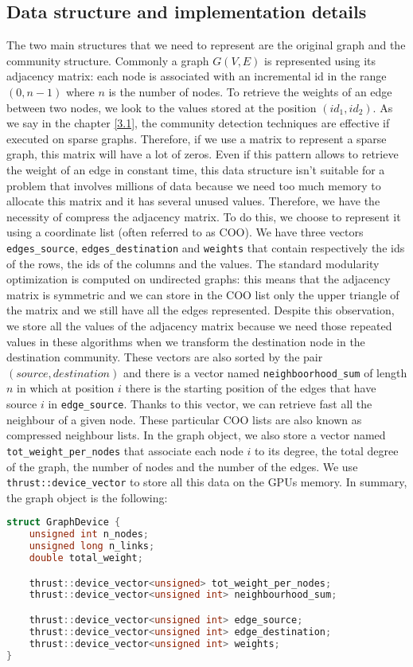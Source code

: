 \subsection{Data structure and implementation details}
The two main structures that we need to represent are the original graph and the community structure. Commonly a graph $G(V, E)$ is represented using its adjacency matrix: each node is associated with an incremental id in the range $(0, n-1)$ where $n$ is the number of nodes. To retrieve the weights of an edge between two nodes, we look to the values stored at the position $(id_1, id_2)$. As we say in the chapter \ref{3.1}, the community detection techniques are effective if executed on sparse graphs.  Therefore, if we use a matrix to represent a sparse graph, this matrix will have a lot of zeros. Even if this pattern allows to retrieve the weight of an edge in constant time, this data structure isn't suitable for a problem that involves millions of data because we need too much memory to allocate this matrix and it has several unused values. Therefore, we have the necessity of compress the adjacency matrix. To do this, we choose to represent it using a coordinate list (often referred to as COO). We have three vectors \verb|edges_source|,  \verb|edges_destination| and  \verb|weights| that contain respectively the ids of the rows, the ids of the columns and the values. The standard modularity optimization is computed on undirected graphs: this means that the adjacency matrix is symmetric and we can store in the COO list only the upper triangle of the matrix and we still have all the edges represented. Despite this observation, we store all the values of the adjacency matrix because we need those repeated values in these algorithms when we transform the destination node in the destination community. These vectors are also sorted by the pair $(source, destination)$ and there is a vector named  \verb|neighboorhood_sum| of length $n$ in which at position $i$ there is the starting position of the edges that have source $i$ in \verb|edge_source|. Thanks to this vector, we can retrieve fast all the neighbour of a given node. These particular COO lists are also known as compressed neighbour lists. In the graph object, we also store a vector named \verb| tot_weight_per_nodes| that associate each node $i$ to its degree, the total degree of the graph, the number of nodes and the number of the edges. We use \verb|thrust::device_vector| to store all this data on the GPUs memory. In summary, the graph object is the following:
\begin{lstlisting}[language=C++]
struct GraphDevice {
	unsigned int n_nodes;
	unsigned long n_links;
	double total_weight;

	thrust::device_vector<unsigned> tot_weight_per_nodes;
	thrust::device_vector<unsigned int> neighbourhood_sum;

	thrust::device_vector<unsigned int> edge_source;
	thrust::device_vector<unsigned int> edge_destination;
	thrust::device_vector<unsigned int> weights;
}
\end{lstlisting}
